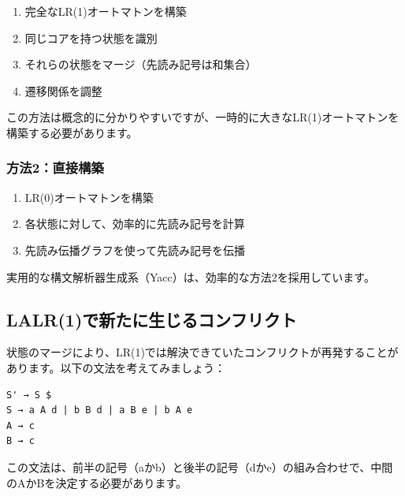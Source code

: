 \begin{enumerate}
\def\labelenumi{\arabic{enumi}.}
\tightlist
\item
  完全なLR(1)オートマトンを構築
\item
  同じコアを持つ状態を識別
\item
  それらの状態をマージ（先読み記号は和集合）
\item
  遷移関係を調整
\end{enumerate}

この方法は概念的に分かりやすいですが、一時的に大きなLR(1)オートマトンを構築する必要があります。

\hypertarget{chapter5-ux65b9ux6cd52ux76f4ux63a5ux69cbux7bc9}{%
\subsubsection{方法2：直接構築}\label{chapter5-ux65b9ux6cd52ux76f4ux63a5ux69cbux7bc9}}

\begin{enumerate}
\def\labelenumi{\arabic{enumi}.}
\tightlist
\item
  LR(0)オートマトンを構築
\item
  各状態に対して、効率的に先読み記号を計算
\item
  先読み伝播グラフを使って先読み記号を伝播
\end{enumerate}

実用的な構文解析器生成系（Yacc）は、効率的な方法2を採用しています。

\hypertarget{chapter5-lalr1ux3067ux65b0ux305fux306bux751fux3058ux308bux30b3ux30f3ux30d5ux30eaux30afux30c8}{%
\subsection{LALR(1)で新たに生じるコンフリクト}\label{chapter5-lalr1ux3067ux65b0ux305fux306bux751fux3058ux308bux30b3ux30f3ux30d5ux30eaux30afux30c8}}

状態のマージにより、LR(1)では解決できていたコンフリクトが再発することがあります。以下の文法を考えてみましょう：

\begin{verbatim}
S' → S $
S → a A d | b B d | a B e | b A e
A → c
B → c
\end{verbatim}

この文法は、前半の記号（aかb）と後半の記号（dかe）の組み合わせで、中間のAかBを決定する必要があります。

